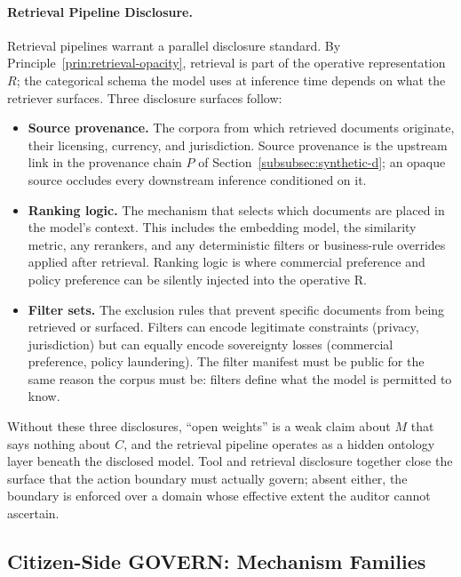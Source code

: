 \documentclass{article}
\theoremstyle{definition}
\begin{document}
\paragraph{Retrieval Pipeline Disclosure.} Retrieval pipelines warrant a parallel disclosure standard. By Principle~\ref{prin:retrieval-opacity}, retrieval is part of the operative representation $R$; the categorical schema the model uses at inference time depends on what the retriever surfaces. Three disclosure surfaces follow:
\begin{itemize}[noitemsep]
    \item \textbf{Source provenance.} The corpora from which retrieved documents originate, their licensing, currency, and jurisdiction. Source provenance is the upstream link in the provenance chain $P$ of Section~\ref{subsubsec:synthetic-d}; an opaque source occludes every downstream inference conditioned on it.
    \item \textbf{Ranking logic.} The mechanism that selects which documents are placed in the model's context. This includes the embedding model, the similarity metric, any rerankers, and any deterministic filters or business-rule overrides applied after retrieval. Ranking logic is where commercial preference and policy preference can be silently injected into the operative R.
    \item \textbf{Filter sets.} The exclusion rules that prevent specific documents from being retrieved or surfaced. Filters can encode legitimate constraints (privacy, jurisdiction) but can equally encode sovereignty losses (commercial preference, policy laundering). The filter manifest must be public for the same reason the corpus must be: filters define what the model is permitted to know.
\end{itemize}

Without these three disclosures, ``open weights'' is a weak claim about $M$ that says nothing about $C$, and the retrieval pipeline operates as a hidden ontology layer beneath the disclosed model. Tool and retrieval disclosure together close the surface that the action boundary must actually govern; absent either, the boundary is enforced over a domain whose effective extent the auditor cannot ascertain.

\subsection{Citizen-Side GOVERN: Mechanism Families}
\label{subsec:govern-mechanisms}
\end{document}
